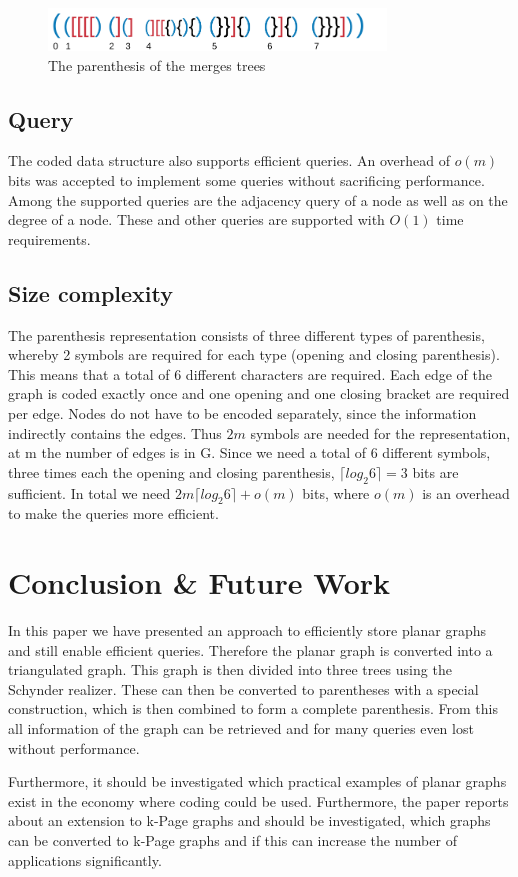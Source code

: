\documentclass[a4paper]{scrartcl}
\begin{document}
\begin{figure}[h]
	\centering
	\includegraphics[width=0.8\textwidth]{img/parenthesisCombi}
	\caption{The parenthesis of the merges trees}
	\label{fig:parenthesisCombi}
\end{figure}

\subsection{Query}
The coded data structure also supports efficient queries. An overhead of $o(m)$ bits was accepted to implement some queries without sacrificing performance. Among the supported queries are the adjacency query of a node as well as on the degree of a node. These and other queries are supported with $O(1)$ time requirements. 

\subsection{Size complexity}
The parenthesis representation consists of three different types of parenthesis, whereby 2 symbols are required for each type (opening and closing parenthesis). This means that a total of 6 different characters are required. Each edge of the graph is coded exactly once and one opening and one closing bracket are required per edge. Nodes do not have to be encoded separately, since the information indirectly contains the edges. Thus $2m$ symbols are needed for the representation, at m the number of edges is in G. Since we need a total of 6 different symbols, three times each the opening and closing parenthesis, $\lceil log_2 6\rceil=3$ bits are sufficient. In total we need $2m\lceil log_2 6\rceil+o(m)$ bits, where $o(m)$ is an overhead to make the queries more efficient. 


\section{Conclusion \& Future Work}
In this paper we have presented an approach to efficiently store planar graphs and still enable efficient queries. Therefore the planar graph is converted into a triangulated graph. This graph is then divided into three trees using the Schynder realizer. These can then be converted to parentheses with a special construction, which is then combined to form a complete parenthesis. From this all information of the graph can be retrieved and for many queries even lost without performance.


Furthermore, it should be investigated which practical examples of planar graphs exist in the economy where coding could be used. Furthermore, the paper reports about an extension to k-Page graphs and should be investigated, which graphs can be converted to k-Page graphs and if this can increase the number of applications significantly.

\pagebreak


\printbibliography
\end{document}

